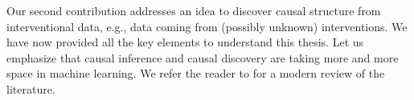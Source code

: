Our second contribution addresses an idea to discover causal structure from interventional data, e.g., data coming from (possibly unknown) interventions.
We have now provided all the key elements to understand this thesis.
Let us emphasize that causal inference and causal discovery are taking more and more space in machine learning.
We refer the reader to \citep{scholkopf2019causality} for a modern review of the literature.

